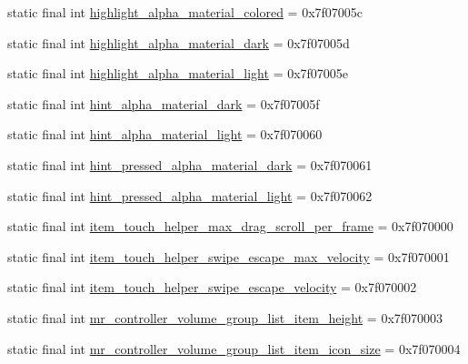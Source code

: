 \begin{CompactItemize}
\item 
static final int \hyperlink{classandroid_1_1support_1_1coreutils_1_1_r_1_1dimen_a6040b5994328c37677c850224ba00fc}{highlight\_\-alpha\_\-material\_\-colored} = 0x7f07005c
\item 
static final int \hyperlink{classandroid_1_1support_1_1coreutils_1_1_r_1_1dimen_8b8114823ad0614a623f4e6118b7411e}{highlight\_\-alpha\_\-material\_\-dark} = 0x7f07005d
\item 
static final int \hyperlink{classandroid_1_1support_1_1coreutils_1_1_r_1_1dimen_a15ffc19be211314847fb79365e37c92}{highlight\_\-alpha\_\-material\_\-light} = 0x7f07005e
\item 
static final int \hyperlink{classandroid_1_1support_1_1coreutils_1_1_r_1_1dimen_802033171915b42fb050ee7a9a08d51c}{hint\_\-alpha\_\-material\_\-dark} = 0x7f07005f
\item 
static final int \hyperlink{classandroid_1_1support_1_1coreutils_1_1_r_1_1dimen_3d99a4d46d9c5293cacec81fcf76a7d0}{hint\_\-alpha\_\-material\_\-light} = 0x7f070060
\item 
static final int \hyperlink{classandroid_1_1support_1_1coreutils_1_1_r_1_1dimen_1205e5f29b4c5b54c4969d64175be50e}{hint\_\-pressed\_\-alpha\_\-material\_\-dark} = 0x7f070061
\item 
static final int \hyperlink{classandroid_1_1support_1_1coreutils_1_1_r_1_1dimen_3e209bff29de2a2d3216e3ff7370ddbc}{hint\_\-pressed\_\-alpha\_\-material\_\-light} = 0x7f070062
\item 
static final int \hyperlink{classandroid_1_1support_1_1coreutils_1_1_r_1_1dimen_07819afd0c07e3a32111fc48df5a0671}{item\_\-touch\_\-helper\_\-max\_\-drag\_\-scroll\_\-per\_\-frame} = 0x7f070000
\item 
static final int \hyperlink{classandroid_1_1support_1_1coreutils_1_1_r_1_1dimen_363cafbd61d7424acc8375a5fcaed5ce}{item\_\-touch\_\-helper\_\-swipe\_\-escape\_\-max\_\-velocity} = 0x7f070001
\item 
static final int \hyperlink{classandroid_1_1support_1_1coreutils_1_1_r_1_1dimen_0f3ab540f536bac8c5dafccec066ffaf}{item\_\-touch\_\-helper\_\-swipe\_\-escape\_\-velocity} = 0x7f070002
\item 
static final int \hyperlink{classandroid_1_1support_1_1coreutils_1_1_r_1_1dimen_2786ddaf1f255ee74f62b0fa22d3f07c}{mr\_\-controller\_\-volume\_\-group\_\-list\_\-item\_\-height} = 0x7f070003
\item 
static final int \hyperlink{classandroid_1_1support_1_1coreutils_1_1_r_1_1dimen_141edc2e568d8d1a1419bba6cf3897ea}{mr\_\-controller\_\-volume\_\-group\_\-list\_\-item\_\-icon\_\-size} = 0x7f070004

\end{CompactItemize}
